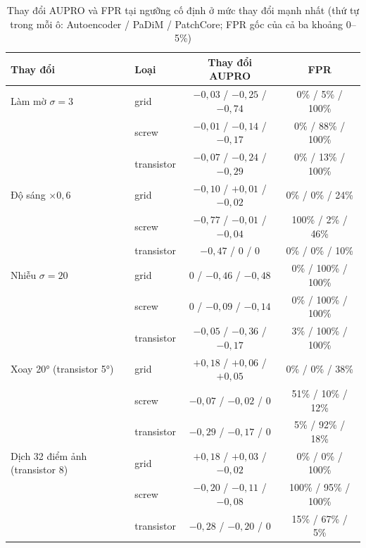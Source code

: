 \begin{table}[htbp]
  \centering
  \caption[Thay đổi AUPRO và FPR tại ngưỡng cố định ở mức thay đổi mạnh nhất]{Thay đổi AUPRO và FPR tại ngưỡng cố định
    ở mức thay đổi mạnh nhất (thứ tự trong mỗi ô: Autoencoder / PaDiM / PatchCore; FPR gốc của cả ba khoảng 0--5\%)}
  \label{tab:tn4}
  \small
  \begin{tabular}{@{}llcc@{}}
    \toprule
    Thay đổi & Loại & Thay đổi AUPRO & FPR \\
    \midrule
    Làm mờ $\sigma = 3$ & grid       & $-0{,}03$ / $-0{,}25$ / $-0{,}74$ & 0\% / 5\% / 100\% \\
                        & screw      & $-0{,}01$ / $-0{,}14$ / $-0{,}17$ & 0\% / 88\% / 100\% \\
                        & transistor & $-0{,}07$ / $-0{,}24$ / $-0{,}29$ & 0\% / 13\% / 100\% \\
    \midrule
    Độ sáng $\times0{,}6$ & grid       & $-0{,}10$ / $+0{,}01$ / $-0{,}02$ & 0\% / 0\% / 24\% \\
                          & screw      & $-0{,}77$ / $-0{,}01$ / $-0{,}04$ & 100\% / 2\% / 46\% \\
                          & transistor & $-0{,}47$ / $0$ / $0$             & 0\% / 0\% / 10\% \\
    \midrule
    Nhiễu $\sigma = 20$ & grid       & $0$ / $-0{,}46$ / $-0{,}48$       & 0\% / 100\% / 100\% \\
                        & screw      & $0$ / $-0{,}09$ / $-0{,}14$       & 0\% / 100\% / 100\% \\
                        & transistor & $-0{,}05$ / $-0{,}36$ / $-0{,}17$ & 3\% / 100\% / 100\% \\
    \midrule
    Xoay 20° (transistor 5°) & grid       & $+0{,}18$ / $+0{,}06$ / $+0{,}05$ & 0\% / 0\% / 38\% \\
                             & screw      & $-0{,}07$ / $-0{,}02$ / $0$       & 51\% / 10\% / 12\% \\
                             & transistor & $-0{,}29$ / $-0{,}17$ / $0$       & 5\% / 92\% / 18\% \\
    \midrule
    Dịch 32 điểm ảnh (transistor 8) & grid       & $+0{,}18$ / $+0{,}03$ / $-0{,}02$ & 0\% / 0\% / 100\% \\
                                    & screw      & $-0{,}20$ / $-0{,}11$ / $-0{,}08$ & 100\% / 95\% / 100\% \\
                                    & transistor & $-0{,}28$ / $-0{,}20$ / $0$       & 15\% / 67\% / 5\% \\
    \bottomrule
  \end{tabular}
\end{table}

